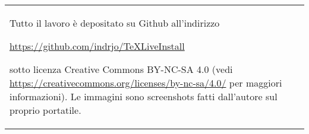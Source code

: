 
~\vfill
\begin{center}
\begin{tabular}{p{}}
Tutto il lavoro è depositato su {\sf Github} all'indirizzo
\begin{center}
\url{https://github.com/indrjo/TeXLiveInstall}
\end{center}
sotto licenza {\sf Creative Commons BY-NC-SA 4.0} (vedi \url{https://creativecommons.org/licenses/by-nc-sa/4.0/}
per maggiori informazioni). Le immagini sono screenshots fatti dall'autore sul proprio portatile.
\end{tabular}
\end{center}